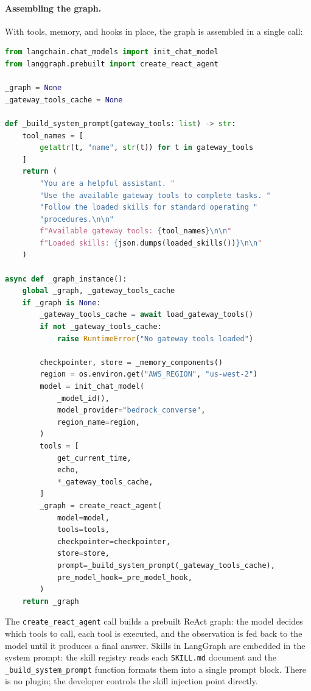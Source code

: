 \paragraph{Assembling the graph.}

With tools, memory, and hooks in place, the graph is assembled in a single call:

\begin{lstlisting}[language=Python]
from langchain.chat_models import init_chat_model
from langgraph.prebuilt import create_react_agent

_graph = None
_gateway_tools_cache = None

def _build_system_prompt(gateway_tools: list) -> str:
    tool_names = [
        getattr(t, "name", str(t)) for t in gateway_tools
    ]
    return (
        "You are a helpful assistant. "
        "Use the available gateway tools to complete tasks. "
        "Follow the loaded skills for standard operating "
        "procedures.\n\n"
        f"Available gateway tools: {tool_names}\n\n"
        f"Loaded skills: {json.dumps(loaded_skills())}\n\n"
    )

async def _graph_instance():
    global _graph, _gateway_tools_cache
    if _graph is None:
        _gateway_tools_cache = await load_gateway_tools()
        if not _gateway_tools_cache:
            raise RuntimeError("No gateway tools loaded")

        checkpointer, store = _memory_components()
        region = os.environ.get("AWS_REGION", "us-west-2")
        model = init_chat_model(
            _model_id(),
            model_provider="bedrock_converse",
            region_name=region,
        )
        tools = [
            get_current_time,
            echo,
            *_gateway_tools_cache,
        ]
        _graph = create_react_agent(
            model=model,
            tools=tools,
            checkpointer=checkpointer,
            store=store,
            prompt=_build_system_prompt(_gateway_tools_cache),
            pre_model_hook=_pre_model_hook,
        )
    return _graph
\end{lstlisting}

The \texttt{create\_react\_agent} call builds a prebuilt ReAct graph: the model decides
which tools to call, each tool is executed, and the observation is fed back to the model
until it produces a final answer. Skills in LangGraph are embedded in the system prompt:
the skill registry reads each \texttt{SKILL.md} document and the
\texttt{\_build\_system\_prompt} function formats them into a single prompt block. There
is no plugin; the developer controls the skill injection point directly.


